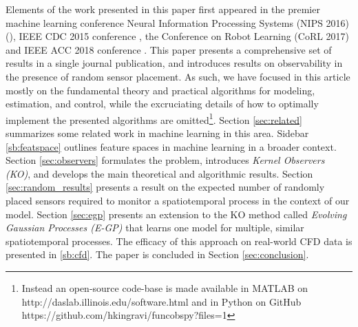 Elements of the work presented in this paper first appeared in the premier machine learning conference Neural Information Processing Systems (NIPS 2016) (\cite{Kingravi16_NIPS,whitman2016NIPSworkshop}), IEEE CDC 2015 conference \cite{Kingravi:2015a}, the Conference on Robot Learning (CoRL 2017) \cite{whitman2017learning} and IEEE ACC 2018 conference \cite{Maske18_ACC}.  This paper presents a comprehensive set of results in a single journal publication, and introduces results on observability in the presence of random sensor placement. As such, we have focused in this article mostly on the fundamental theory and practical algorithms for modeling, estimation, and control, while the excruciating details of how to optimally implement the presented algorithms are omitted\footnote{Instead an open-source code-base is made available in MATLAB on http://daslab.illinois.edu/software.html and in Python on GitHub https://github.com/hkingravi/funcobspy?files=1}. Section \ref{sec:related} summarizes some related work in machine learning in this area. Sidebar \ref{sb:featspace} outlines feature spaces in machine learning in a broader context. Section \ref{sec:observers} formulates the problem,  introduces \emph{Kernel Observers (KO)}, and develops the main theoretical and algorithmic results.
Section \ref{sec:random_results} presents a result on the expected number of randomly placed sensors required to monitor a spatiotemporal process in the context of our model. Section \ref{sec:egp} presents an extension to the KO method called \emph{Evolving Gaussian Processes (E-GP)} that learns one model for multiple, similar spatiotemporal processes. The efficacy of this approach on real-world CFD data is presented in \ref{sb:cfd}.
The paper is concluded in Section \ref{sec:conclusion}. 

